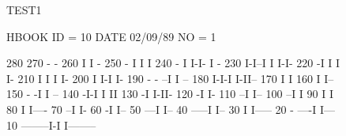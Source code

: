 \begin{figure}[p]
\begin{minipage}[t]{.55\textwidth}
\begin{XMPfrac}{3.5}
TEST1
 
HBOOK     ID =        10                                        DATE  02/09/89                          NO =  1
 
     280
     270                                                      - -
     260                                                      I I  -
     250                                                   -  I I  I
     240                                                 - I  I-I- I -
     230                                                 I-I--I  I I-I-
     220                                                -I       I I  I-
     210                                                I        I I   I-
     200                                                I        I-I    I-
     190                                          - - --I                I --
     180                                          I-I-I                  I-II--
     170                                          I                           I
     160                                          I                           I--
     150                                       - -I                             I --
     140                                      -I-I                              I II
     130                                     -I                                 I-II-
     120                                    -I                                      I-
     110                                  --I                                        I--
     100                                --I                                            I
      90                                I                                              I
      80                                I                                              I----
      70                              --I                                                  I-
      60                             -I                                                     I--
      50                          ---I                                                        I--
      40                     -----I                                                             I--
      30                     I                                                                    I-----
      20               - ----I                                                                         I---
      10       --------I-I                                                                                I--------
 

\end{XMPfrac}
\end{minipage}
\end{figure}
